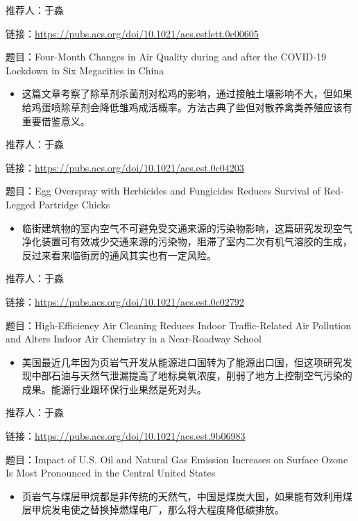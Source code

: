 \documentclass[]{book}
\providecommand{\tightlist}{%
  \setlength{\itemsep}{0pt}\setlength{\parskip}{0pt}}
\begin{document}
推荐人：于淼

链接：\url{https://pubs.acs.org/doi/10.1021/acs.estlett.0c00605}

题目：Four-Month Changes in Air Quality during and after the COVID-19 Lockdown in Six Megacities in China

\begin{itemize}
\tightlist
\item
  这篇文章考察了除草剂杀菌剂对松鸡的影响，通过接触土壤影响不大，但如果给鸡蛋喷除草剂会降低雏鸡成活概率。方法古典了些但对散养禽类养殖应该有重要借鉴意义。
\end{itemize}

推荐人：于淼

链接：\url{https://pubs.acs.org/doi/10.1021/acs.est.0c04203}

题目：Egg Overspray with Herbicides and Fungicides Reduces Survival of Red-Legged Partridge Chicks

\begin{itemize}
\tightlist
\item
  临街建筑物的室内空气不可避免受交通来源的污染物影响，这篇研究发现空气净化装置可有效减少交通来源的污染物，阻滞了室内二次有机气溶胶的生成，反过来看来临街房的通风其实也有一定风险。
\end{itemize}

推荐人：于淼

链接：\url{https://pubs.acs.org/doi/10.1021/acs.est.0c02792}

题目：High-Efficiency Air Cleaning Reduces Indoor Traffic-Related Air Pollution and Alters Indoor Air Chemistry in a Near-Roadway School

\begin{itemize}
\tightlist
\item
  美国最近几年因为页岩气开发从能源进口国转为了能源出口国，但这项研究发现中部石油与天然气泄漏提高了地标臭氧浓度，削弱了地方上控制空气污染的成果。能源行业跟环保行业果然是死对头。
\end{itemize}

推荐人：于淼

链接：\url{https://pubs.acs.org/doi/10.1021/acs.est.9b06983}

题目：Impact of U.S. Oil and Natural Gas Emission Increases on Surface Ozone Is Most Pronounced in the Central United States

\begin{itemize}
\tightlist
\item
  页岩气与煤层甲烷都是非传统的天然气，中国是煤炭大国，如果能有效利用煤层甲烷发电使之替换掉燃煤电厂，那么将大程度降低碳排放。
\end{itemize}
\end{document}
